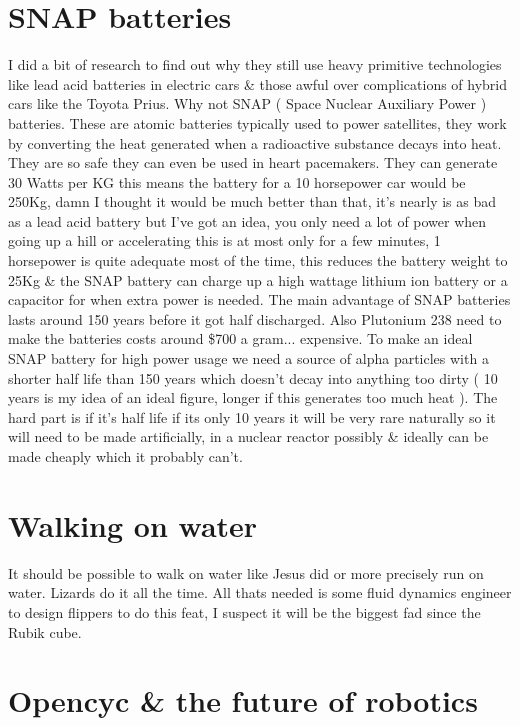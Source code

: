\documentclass[a4paper,12pt,titlepage]{book}
\begin{document}
\section{SNAP batteries}
I did a bit of research to find out why they still use
heavy primitive technologies like lead acid batteries 
in electric cars \& those awful over complications of 
hybrid cars like the Toyota Prius. Why not SNAP
( Space Nuclear Auxiliary Power ) batteries.
These are atomic batteries typically used to power satellites,
they work by converting the heat generated when a radioactive
substance decays into heat.
They are so safe they can even be used in heart pacemakers.
They can generate 30 Watts per KG this means the battery
for a 10 horsepower car would be 250Kg,  damn I thought
it would be much better than that, it's nearly
is as bad as a lead acid battery but I've got an idea,
you only need a lot of power when going up a hill
or accelerating this is at most only for a few minutes,
1 horsepower is quite adequate most of the time,
this reduces the battery weight to 25Kg \&
the SNAP battery can charge up a high wattage lithium
ion battery or a capacitor for when extra power is needed.
The main advantage of SNAP batteries lasts 
around 150 years before it got half discharged.
Also Plutonium 238 need to make the batteries 
costs around \$700 a gram... expensive.
To make an ideal SNAP battery for high power usage
we need a source of alpha particles with a shorter 
half life than 150 years which doesn't decay into
anything too dirty  ( 10 years is my idea of an ideal
figure, longer if this generates too much heat ).
The hard part is if it's half
life if its only 10 years it will be very rare naturally so
it will need to be made artificially, in a nuclear reactor possibly
\& ideally can be made cheaply which it probably can't.

\section{Walking on water}
It should be possible to walk on water like Jesus
did or more precisely run on water. Lizards do
it all the time. All thats needed is some
fluid dynamics engineer to design flippers 
to do this feat, I suspect it will be the biggest
fad since the Rubik cube.

\section{Opencyc \& the future of robotics}
\end{document}
